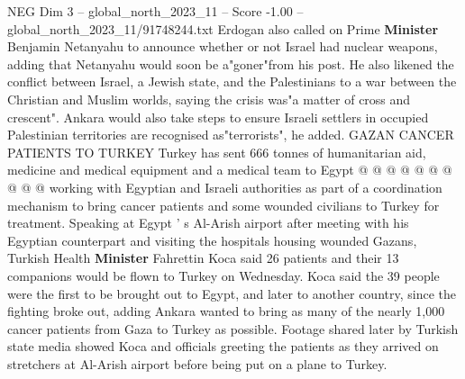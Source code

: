 \begin{textsample}{NEG Dim 3 – global\_north\_2023\_11 – Score -1.00 – global\_north\_2023\_11/91748244.txt}
Erdogan also called on Prime \textbf{Minister} Benjamin Netanyahu to announce whether or not Israel had nuclear weapons, adding that Netanyahu would soon be a"goner"from his post.
He also likened the conflict between Israel, a Jewish state, and the Palestinians to a war between the Christian and Muslim worlds, saying the crisis was"a matter of cross and crescent".
Ankara would also take steps to ensure Israeli settlers in occupied Palestinian territories are recognised as"terrorists", he added.
GAZAN CANCER PATIENTS TO TURKEY Turkey has sent 666 tonnes of humanitarian aid, medicine and medical equipment and a medical team to Egypt @ @ @ @ @ @ @ @ @ @ working with Egyptian and Israeli authorities as part of a coordination mechanism to bring cancer patients and some wounded civilians to Turkey for treatment.
Speaking at Egypt ' s Al-Arish airport after meeting with his Egyptian counterpart and visiting the hospitals housing wounded Gazans, Turkish Health \textbf{Minister} Fahrettin Koca said 26 patients and their 13 companions would be flown to Turkey on Wednesday.
Koca said the 39 people were the first to be brought out to Egypt, and later to another country, since the fighting broke out, adding Ankara wanted to bring as many of the nearly 1,000 cancer patients from Gaza to Turkey as possible.
Footage shared later by Turkish state media showed Koca and officials greeting the patients as they arrived on stretchers at Al-Arish airport before being put on a plane to Turkey.

\end{textsample}
